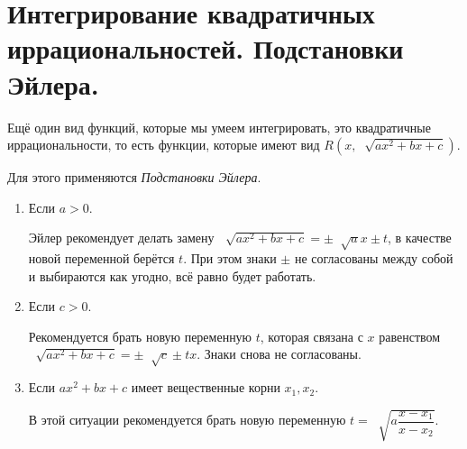 \documentclass[../main.tex]{subfiles}
\begin{document}
\newpage
\section{Интегрирование квадратичных иррациональностей. Подстановки Эйлера.}
Ещё один вид функций, которые мы умеем интегрировать, это квадратичные иррациональности, то есть функции, которые имеют вид \( R\left( x, \;\sqrt[]{ax^2+bx+c}\right)\). 

Для этого применяются \emph{Подстановки Эйлера}. 
\begin{enumerate}
    \item Если \( a>0\). 
    \par Эйлер рекомендует делать замену \( \;\sqrt[]{ax^2+bx+c}=\pm \;\sqrt[]{a}x \pm t\), в качестве новой переменной берётся \( t\). При этом знаки \( \pm\) не согласованы между собой 
    и выбираются как угодно, всё равно будет работать. 
    \item Если \( c>0\).
    \par Рекомендуется брать новую переменную \( t\), которая связана с \( x\) равенством \( \;\sqrt[]{ax^2+bx+c}=\pm \;\sqrt[]{c}\pm tx\). Знаки снова не согласованы. 
    \item Если \( ax^2+bx+c\) имеет вещественные корни \( x_1, x_2\). 
    \par В этой ситуации рекомендуется брать новую переменную \( t = \;\sqrt[]{a \dfrac{ x-x_1}{ x-x_2} }\).
\end{enumerate}
\end{document}
